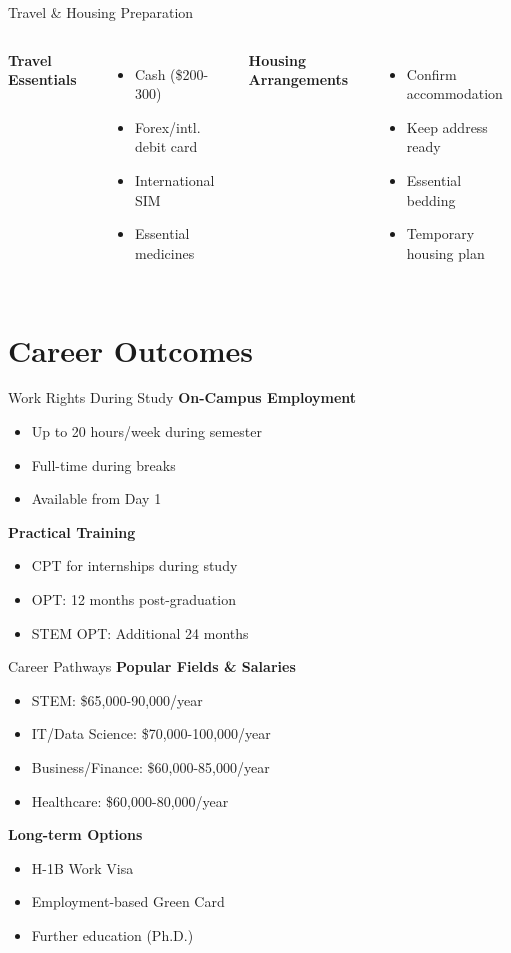 \documentclass{beamer}
\begin{document}
\begin{frame}{Travel \& Housing Preparation}
\begin{columns}
\textbf{Travel Essentials}
\begin{itemize}
\item Cash (\$200-300)
\item Forex/intl. debit card
\item International SIM
\item Essential medicines
\end{itemize}

\textbf{Housing Arrangements}
\begin{itemize}
\item Confirm accommodation
\item Keep address ready
\item Essential bedding
\item Temporary housing plan
\end{itemize}
\end{columns}
\end{frame}

\section{Career Outcomes}
\begin{frame}{Work Rights During Study}
\textbf{On-Campus Employment}
\begin{itemize}
\item Up to 20 hours/week during semester
\item Full-time during breaks
\item Available from Day 1
\end{itemize}

\textbf{Practical Training}
\begin{itemize}
\item CPT for internships during study
\item OPT: 12 months post-graduation
\item STEM OPT: Additional 24 months
\end{itemize}
\end{frame}

\begin{frame}{Career Pathways}
\textbf{Popular Fields \& Salaries}
\begin{itemize}
\item STEM: \$65,000-90,000/year
\item IT/Data Science: \$70,000-100,000/year
\item Business/Finance: \$60,000-85,000/year
\item Healthcare: \$60,000-80,000/year
\end{itemize}

\textbf{Long-term Options}
\begin{itemize}
\item H-1B Work Visa
\item Employment-based Green Card
\item Further education (Ph.D.)
\end{itemize}
\end{frame}
\end{document}
